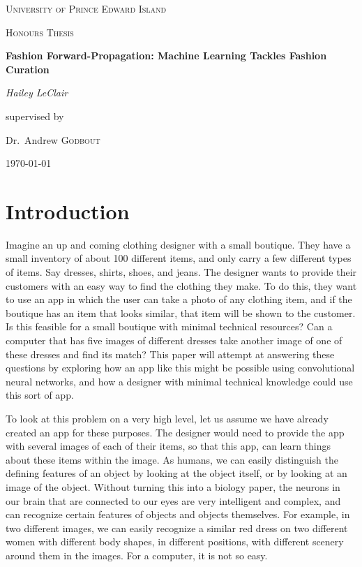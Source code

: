 \documentclass[12pt]{report} %
\begin{document}
\begin{titlepage}
\centering
    {\scshape\LARGE University of Prince Edward Island\par}
    \vspace{1cm}
    {\scshape\Large Honours Thesis\par}
    \vspace{1.5cm}
    {\huge\bfseries Fashion Forward-Propagation: Machine Learning Tackles Fashion Curation\par}
    \vspace{2cm}
    {\Large\itshape Hailey LeClair\par}
    \vfill
    supervised by\par
    Dr.~Andrew \textsc{Godbout}

\vfill

\today\par

\end{titlepage}
\tableofcontents
\newpage
\listoffigures
\newpage


\chapter{Introduction}

	Imagine an up and coming clothing designer with a small boutique. They have a small inventory of about 100 different items, and only carry a few different types of items. Say dresses, shirts, shoes, and jeans. The designer wants to provide their customers with an easy way to find the clothing they make. To do this, they want to use an app in which the user can take a photo of any clothing item, and if the boutique has an item that looks similar, that item will be shown to the customer. Is this feasible for a small boutique with minimal technical resources? Can a computer that has five images of different dresses take another image of one of these dresses and find its match? This paper will attempt at answering these questions by exploring how an app like this might be possible using convolutional neural networks, and how a designer with minimal technical knowledge could use this sort of app.
	
	To look at this problem on a very high level, let us assume we have already created an app for these purposes. The designer would need to provide the app with several images of each of their items, so that this app, can learn things about these items within the image. As humans, we can easily distinguish the defining features of an object by looking at the object itself, or by looking at an image of the object. Without turning this into a biology paper, the neurons in our brain that are connected to our eyes are very intelligent and complex, and can recognize certain features of objects and objects themselves\cite{aurelienMachineLearning}. For example, in two different images, we can easily recognize a similar red dress on two different women with different body shapes, in different positions, with different scenery around them in the images. For a computer, it is not so easy. 
	
\end{document}
